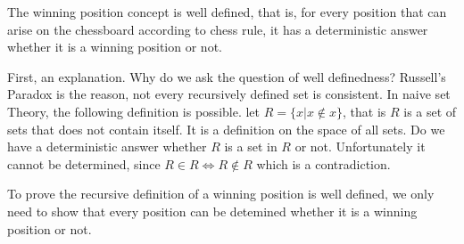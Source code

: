 \begin{prop}
The winning position concept is well defined, that is, for every position that can arise on the chessboard according to chess rule, it has a deterministic answer whether it is a winning position or not.
\end{prop}

First, an explanation. Why do we ask the question of well definedness? Russell's Paradox is the reason, not every recursively defined set is consistent. In naive set Theory, the following definition is possible.
let $R=\{x|x \not\in x\}$, that is $R$ is a set of sets that does not contain itself. It is a definition on the space of all sets. Do we have a deterministic answer whether $R$ is a set in $R$ or not.
Unfortunately it cannot be determined, since $R \in R \iff R \not \in R$ which is a contradiction.





To prove the recursive definition of a winning position is well defined, we only need to show that every position can be detemined whether it is a winning position or not.

